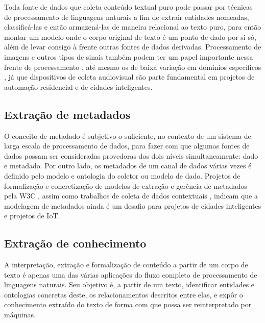 Toda fonte de dados que coleta conteúdo textual puro pode passar por técnicas de processamento de linguagens naturais a fim de extrair entidades nomeadas, classificá-las e então armazená-las de maneira relacional ao texto puro, para então montar um modelo onde o corpo original de texto é um ponto de dado por si só, além de levar consigo à frente outras fontes de dados derivadas. Processamento de imagens e outros tipos de sinais também podem ter um papel importante nessa frente de processamento \cite{cornel:ner}, até mesmo os de baixa variação em domínios específicos \cite{aalto:ner}, já que dispositivos de coleta audiovisual são parte fundamental em projetos de automação residencial e de cidades inteligentes.

\subsection{Extração de metadados} \label{ss:extracao_de_metadados}

O conceito de metadado é subjetivo o suficiente, no contexto de um sistema de larga escala de processamento de dados, para fazer com que algumas fontes de dados possam ser consideradas provedoras dos dois níveis simultaneamente: dado e metadado. Por outro lado, os metadados de um canal de dados várias vezes é definido pelo modelo e ontologia do coletor ou modelo de dado. Projetos de formalização e concretização de modelos de extração e gerência de metadados pela W3C \cite{w3c:ssn}, assim como trabalhos de coleta de dados contextuais \cite{contextualdata:smartcities}, indicam que a modelagem de metadados ainda é um desafio para projetos de cidades inteligentes e projetos de IoT.

\subsection{Extração de conhecimento} \label{ss:extracao_de_conhecimento}

A interpretação, extração e formalização de conteúdo a partir de um corpo de texto é apenas uma das várias aplicações do fluxo completo de processamento de linguagens naturais. Seu objetivo é, a partir de um texto, identificar entidades e ontologias concretas deste, os relacionamentos descritos entre elas, e expôr o conhecimento extraído do texto de forma com que possa ser reinterpretado por máquinas.